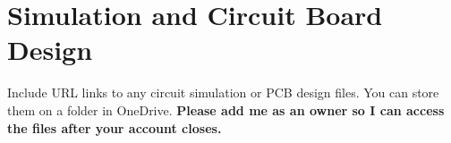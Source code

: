 \section{Simulation and Circuit Board Design}
Include URL links to any circuit simulation or PCB design files. You can store them on a folder in OneDrive. \textbf{Please add me as an owner so I can access the files after your account closes.}